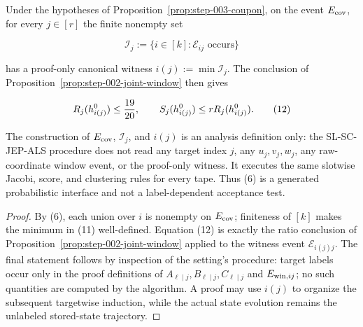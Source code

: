 \begin{proposition}\label{prop:step-003-witness-interface}
Under the hypotheses of Proposition~\ref{prop:step-003-coupon}, on the
event \(E_{\rm cov}\), for every \(j\in[r]\) the finite nonempty set

\[
\mathcal I_j:=\{i\in[k]:\mathscr E_{ij}\text{ occurs}\}
\tag{11}
\]

has a proof-only canonical witness \(i(j):=\min\mathcal I_j\). The
conclusion of Proposition~\ref{prop:step-002-joint-window} then gives

\[
R_j(h_{i(j)}^0)\le{19\over20},\qquad
S_j(h_{i(j)}^0)\le rR_j(h_{i(j)}^0).
\tag{12}
\]

The construction of \(E_{\rm cov}\), \(\mathcal I_j\), and \(i(j)\) is an
analysis definition only: the SL-SC-JEP-ALS procedure does not read any
target index \(j\), any \(u_j,v_j,w_j\), any raw-coordinate window event, or
the proof-only witness. It executes the same slotwise Jacobi, score, and
clustering rules for every tape. Thus (6) is a generated probabilistic
interface and not a label-dependent acceptance test.

\begin{proof}
By (6), each union over \(i\) is nonempty on \(E_{\rm cov}\); finiteness of
\([k]\) makes the minimum in (11) well-defined. Equation (12) is exactly
the ratio conclusion of Proposition~\ref{prop:step-002-joint-window} applied
to the witness event \(\mathscr E_{i(j)j}\). The final statement follows by
inspection of the setting's procedure: target labels occur only in the
proof definitions of \(A_{\ell\mid j},B_{\ell\mid j},C_{\ell\mid j}\) and
\(E_{{\rm win},ij}\); no such quantities are computed by the algorithm. A
proof may use \(i(j)\) to organize the subsequent targetwise induction,
while the actual state evolution remains the unlabeled stored-state
trajectory. 

\end{proof}
\end{proposition}
